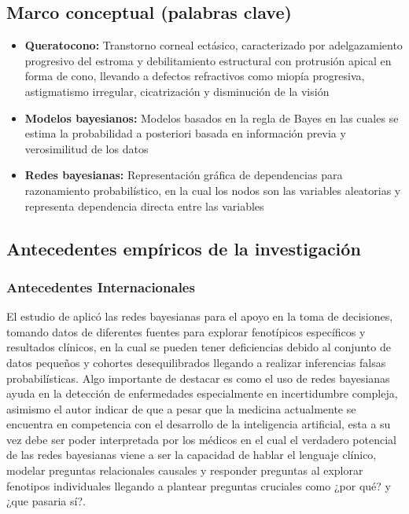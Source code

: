 \subsection{Marco conceptual (palabras clave)}

\begin{itemize}
\item \textbf{Queratocono:} Transtorno corneal ectásico, caracterizado por adelgazamiento progresivo del estroma y debilitamiento estructural con protrusión apical en forma de cono, llevando a defectos refractivos como miopía progresiva, astigmatismo irregular, cicatrización y disminución de la visión \parencite{caruso2024corneal}

\item \textbf{Modelos bayesianos:} Modelos basados en la regla de Bayes en las cuales se estima la probabilidad a posteriori basada en información previa y verosimilitud de los datos \parencite{koski2011bayesian}

\item \textbf{Redes bayesianas:} Representación gráfica de dependencias para razonamiento probabilístico, en la cual los nodos son las variables aleatorias y representa dependencia directa entre las variables \parencite{sucar2006redes}
\end{itemize}


\subsection{Antecedentes empíricos de la investigación}
\subsubsection{Antecedentes Internacionales}
El estudio de \textcite{waddell2023applying} aplicó las redes bayesianas para el apoyo en la toma de decisiones, tomando datos de diferentes fuentes para explorar fenotípicos específicos y resultados clínicos, en la cual se pueden tener deficiencias debido al conjunto de datos pequeños y cohortes desequilibrados llegando a realizar inferencias falsas probabilísticas. Algo importante de destacar es como el uso de redes bayesianas ayuda en la detección de enfermedades especialmente en incertidumbre compleja, asimismo el autor indicar de que a pesar que la medicina actualmente se encuentra en competencia con el desarrollo de la inteligencia artificial, esta a su vez debe ser poder interpretada por los médicos en el cual el verdadero potencial de las redes bayesianas viene a ser la capacidad de hablar el lenguaje clínico, modelar preguntas relacionales causales y responder preguntas al explorar fenotipos individuales llegando a plantear preguntas cruciales como ¿por qué? y ¿que pasaria sí?. \\

